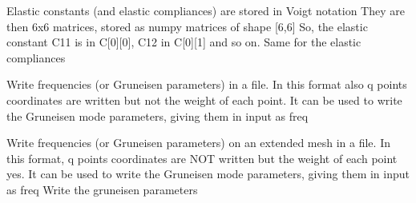 \documentclass[letterpaper,10pt,english]{sphinxmanual}
\begin{document}

\begin{fulllineitems}
\label{pyqha:pyqha.write.write_celldmsT}
\end{fulllineitems}


\begin{fulllineitems}
\label{pyqha:pyqha.write.write_elastic_constants}
Elastic constants (and elastic compliances) are stored in Voigt notation 
They are then 6x6 matrices, stored as numpy matrices of shape {[}6,6{]}
So, the elastic constant C11 is in C{[}0{]}{[}0{]}, C12 in C{[}0{]}{[}1{]} and so on.
Same for the elastic compliances

\end{fulllineitems}


\begin{fulllineitems}
\label{pyqha:pyqha.write.write_freq}
Write frequencies (or Gruneisen parameters) in a file. In this format also q points
coordinates are written but not the weight of each point.
It can be used to write the Gruneisen mode parameters, giving them in input as freq

\end{fulllineitems}


\begin{fulllineitems}
\label{pyqha:pyqha.write.write_freq_ext}
Write frequencies (or Gruneisen parameters) on an extended mesh in a file.
In this format, q points coordinates are NOT written but the weight of each point yes.
It can be used to write the Gruneisen mode parameters, giving them in input as freq
Write the gruneisen parameters

\end{fulllineitems}
\end{document}
